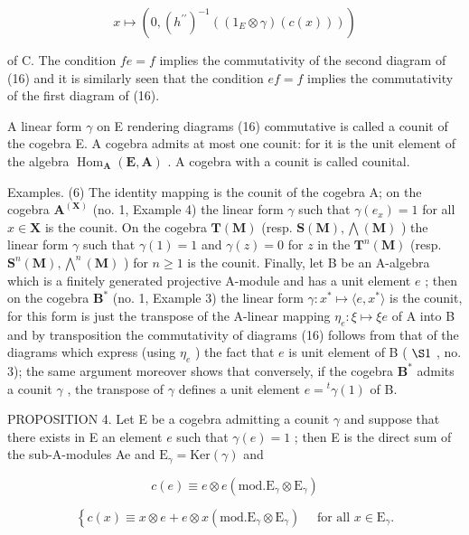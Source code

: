 \[
x \mapsto (0, (h ^ {\prime \prime}) ^ {- 1} ((1 _ {E} \otimes \gamma) (c (x))))
\]

of C. The condition \(fe = f\) implies the commutativity of the second diagram of (16) and it is similarly seen that the condition \(ef = f\) implies the commutativity of the first diagram of (16).

A linear form \(\gamma\) on E rendering diagrams (16) commutative is called a counit of the cogebra E. A cogebra admits at most one counit: for it is the unit element of the algebra \(\operatorname{Hom}_{\mathbf{A}}(\mathbf{E}, \mathbf{A})\) . A cogebra with a counit is called counital.

Examples. (6) The identity mapping is the counit of the cogebra A; on the cogebra \(\mathbf{A}^{(\mathbf{X})}\) (no. 1, Example 4) the linear form \(\gamma\) such that \(\gamma(e_x) = 1\) for all \(x \in \mathbf{X}\) is the counit. On the cogebra \(\mathbf{T}(\mathbf{M})\) (resp. \(\mathbf{S}(\mathbf{M}), \bigwedge(\mathbf{M})\) ) the linear form \(\gamma\) such that \(\gamma(1) = 1\) and \(\gamma(z) = 0\) for \(z\) in the \(\mathbf{T}^n(\mathbf{M})\) (resp. \(\mathbf{S}^n(\mathbf{M}), \bigwedge^n(\mathbf{M})\) ) for \(n \geqslant 1\) is the counit. Finally, let B be an A-algebra which is a finitely generated projective A-module and has a unit element \(e\) ; then on the cogebra \(\mathbf{B}^*\) (no. 1, Example 3) the linear form \(\gamma: x^* \mapsto \langle e, x^* \rangle\) is the counit, for this form is just the transpose of the A-linear mapping \(\eta_e: \xi \mapsto \xi e\) of A into B and by transposition the commutativity of diagrams (16) follows from that of the diagrams which express (using \(\eta_e\) ) the fact that \(e\) is unit element of B ( \(\S 1\) , no. 3); the same argument moreover shows that conversely, if the cogebra \(\mathbf{B}^*\) admits a counit \(\gamma\) , the transpose of \(\gamma\) defines a unit element \(e = {}^t\gamma(1)\) of B.

PROPOSITION 4. Let E be a cogebra admitting a counit \(\gamma\) and suppose that there exists in E an element \(e\) such that \(\gamma(e) = 1\) ; then E is the direct sum of the sub-A-modules Ae and \(\mathrm{E}_{\gamma} = \mathrm{Ker}(\gamma)\) and

\[
c (e) \equiv e \otimes e (\mathrm{mod.} \mathrm{E} _ {\gamma} \otimes \mathrm{E} _ {\gamma})\tag{18}
\]

\[
\left\{c (x) \equiv x \otimes e + e \otimes x (\mathrm{mod.} \mathrm{E} _ {\gamma} \otimes \mathrm{E} _ {\gamma}) \quad \text { for all } x \in \mathrm{E} _ {\gamma}. \right.
\]

